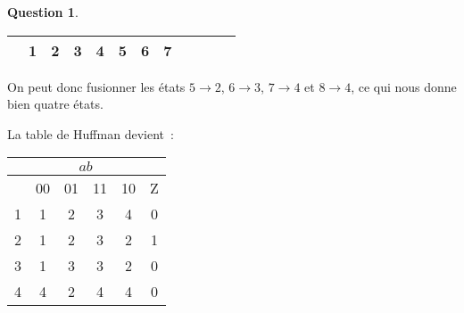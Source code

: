 \documentclass[11pt,a4paper]{article}
\theoremstyle{definition}%
\newtheorem{Q}{Question}[] %
\begin{document}
\begin{Q}
{\begin{center}
\begin{tabular}{|c|c|c|c|c|c|c|c|c|c|c|c|}
				 & 1 & 2 & 3 & 4 & 5 & 6 & 7 \\ \hline
			\end{tabular}
		\end{center}

		On peut donc fusionner les états $5 \rightarrow 2$, $6 \rightarrow 3$, $7 \rightarrow 4$ et $8 \rightarrow 4$, ce qui nous donne bien quatre états.

		La table de Huffman devient~:
		\begin{center}
			\begin{tabular}{|c|c|c|c|c|c|}\hline
			 & \multicolumn{4}{c|}{$ab$} & \\ \hline
			 & 00 & 01 & 11 & 10 & Z \\ \hline
			1 & 1 & 2 & 3 & 4 & 0 \\ \hline
			2 & 1 & 2 & 3 & 2 & 1 \\ \hline
			3 & 1 & 3 & 3 & 2 & 0 \\ \hline
			4 & 4 & 2 & 4 & 4 & 0 \\ \hline
			\end{tabular}
		\end{center}

}
\end{Q}
\end{document}
